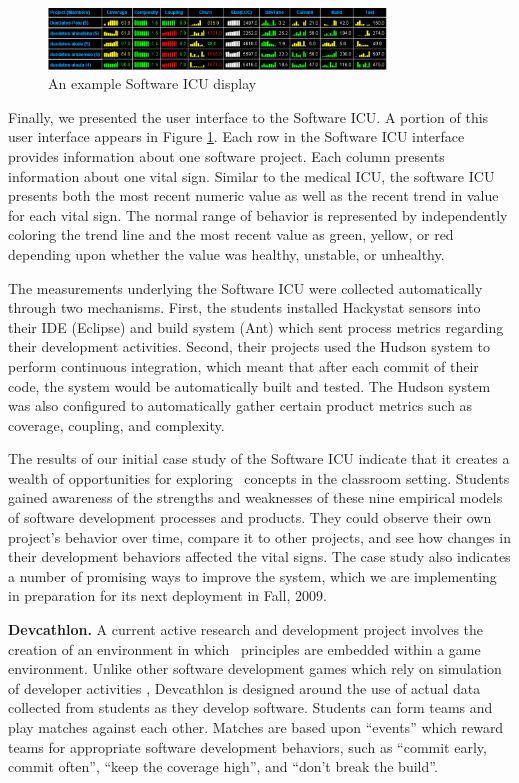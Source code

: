 \begin{figure}[ht]
  \center
  \includegraphics[width=0.8\textwidth]{portfolio-2008.eps}
  \caption{An example Software ICU display}
  \label{fig:sicu}
\end{figure} 

Finally, we presented the user interface to the Software ICU. A portion of
this user interface appears in Figure \ref{fig:sicu}.  Each row in the
Software ICU interface provides information about one software project.
Each column presents information about one vital sign. Similar to the
medical ICU, the software ICU presents both the most recent numeric value
as well as the recent trend in value for each vital sign.  The normal range
of behavior is represented by independently coloring the trend line and the
most recent value as green, yellow, or red depending upon whether the value
was healthy, unstable, or unhealthy.  

The measurements underlying the Software ICU were collected automatically
through two mechanisms. First, the students installed Hackystat sensors
into their IDE (Eclipse) and build system (Ant) which sent process
metrics regarding their development activities.  Second, their projects
used the Hudson system to perform continuous integration, which meant that
after each commit of their code, the system would be automatically built
and tested.  The Hudson system was also configured to automatically gather
certain product metrics such as coverage, coupling, and complexity.

The results of our initial case study of the Software ICU indicate that it
creates a wealth of opportunities for exploring \eCT\ concepts in the
classroom setting. Students gained awareness of the strengths and
weaknesses of these nine empirical models of software development processes
and products. They could observe their own project's behavior over time,
compare it to other projects, and see how changes in their development
behaviors affected the vital signs.  The case study also indicates a number
of promising ways to improve the system, which we are implementing in
preparation for its next deployment in Fall, 2009.

{\bf Devcathlon.} A current active research and development project
involves the creation of an environment in which \eCT\ principles are
embedded within a game environment.  Unlike other software development
games which rely on simulation of developer activities
\citep{Drappa00,Navarro09,Jain06}, Devcathlon is designed around the use of actual
data collected from students as they develop software.  Students can form
teams and play matches against each other.  Matches are based upon
``events'' which reward teams for appropriate software development
behaviors, such as ``commit early, commit often'', ``keep the coverage
high'', and ``don't break the build''.


